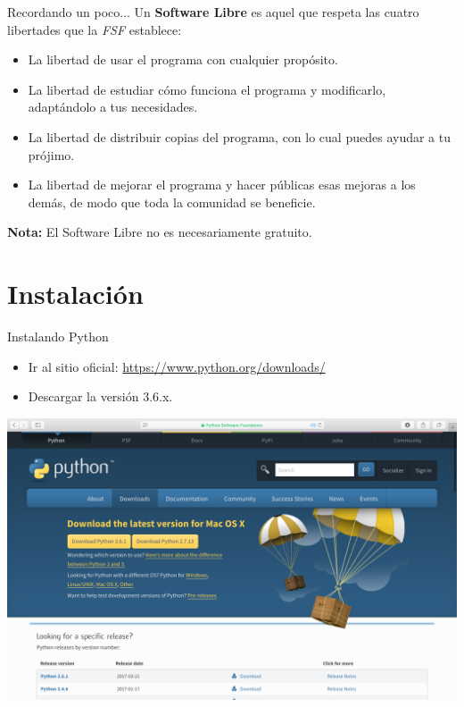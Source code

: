 \documentclass[usenames,dvipsnames]{beamer}
\begin{document}
  \begin{frame}{Recordando un poco...}
    Un \textbf{Software Libre} es aquel que respeta las cuatro libertades que
    la \textit{FSF} establece:
    \begin{itemize}
      \item La libertad de usar el programa con cualquier propósito.
      \item La libertad de estudiar cómo funciona el programa y modificarlo,
      adaptándolo a tus necesidades.
      \item La libertad de distribuir copias del programa, con lo cual puedes
      ayudar a tu prójimo.
      \item La libertad de mejorar el programa y hacer públicas esas mejoras a
      los demás, de modo que toda la comunidad se beneficie.
    \end{itemize}
    \textbf{Nota:} El Software Libre no es necesariamente gratuito.
  \end{frame}

  \section{Instalación}
  \begin{frame}{Instalando Python}
    \begin{itemize}
      \item Ir al sitio oficial: {\color{RoyalBlue} \url{https://www.python.org/downloads/}}
      \item Descargar la versión 3.6.x.
    \end{itemize}
    \begin{center}
      \begin{tcolorbox}[beamer,
                  width=1.065\textheight,
                  arc=0pt,
                  boxsep=0pt,
                  left=0pt,right=0pt,top=0pt,bottom=0pt,
                  ]
        \includegraphics[scale=0.2]{imgs/download}
      \end{tcolorbox}
    \end{center}
  \end{frame}
\end{document}
